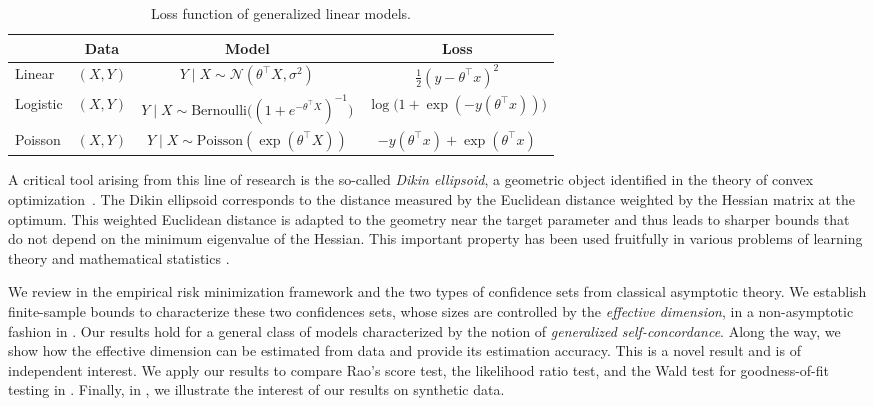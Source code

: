 \begin{table*}[t]
    \caption{Loss function of generalized linear models.}
    \label{tab:glms}
    \centering
    \renewcommand{\arraystretch}{1.2}
    \begin{tabular}{lccc}
        \addlinespace[0.4em]
        \toprule
        & \multicolumn{1}{c}{\textbf{Data}} & \multicolumn{1}{c}{\textbf{Model}} & \textbf{Loss} \\
        \midrule
        Linear & $(X, Y)$ & $Y \mid X \sim \mathcal{N}(\theta^\top X, \sigma^2)$ & $\frac12 (y - \theta^\top x)^2$ \\
        Logistic & $(X, Y)$ & $Y \mid X \sim \mbox{Bernoulli}\big((1 + e^{-\theta^\top X})^{-1}\big)$ & $\log{\big(1 + \exp(-y(\theta^\top x))\big)}$\\
        Poisson & $(X, Y)$ & $Y \mid X \sim \mbox{Poisson}(\exp(\theta^\top X))$ & $-y(\theta^\top x) + \exp(\theta^\top x)$ \\
        \bottomrule
    \end{tabular}
\end{table*}

A critical tool arising from this line of research is the so-called \emph{Dikin ellipsoid}, a geometric object identified in the theory of convex optimization~\citep{yurii1994interior,ben2001lectures,boyd2004convex,tunccel2010self,bubeck2016black,bubeck:2019}.
The Dikin ellipsoid corresponds to the distance measured by the Euclidean distance weighted by the Hessian matrix at the optimum.
This weighted Euclidean distance is adapted to the geometry near the target parameter and thus leads to sharper bounds that do not depend on the minimum eigenvalue of the Hessian. This important property has been used fruitfully in various problems of learning theory and mathematical statistics \citep{zhang2015disco,yang2016optimistic,faury2020improved}.

We review in  the empirical risk minimization framework and the two types of confidence sets from classical asymptotic theory.
We establish finite-sample bounds to characterize these two confidences sets, whose sizes are controlled by the \emph{effective dimension}, in a non-asymptotic fashion in .
Our results hold for a general class of models characterized by the notion of \emph{generalized self-concordance}.
Along the way, we show how the effective dimension can be estimated from data and provide its estimation accuracy.
This is a novel result and is of independent interest.
We apply our results to compare Rao's score test, the likelihood ratio test, and the Wald test for goodness-of-fit testing in .
Finally, in , we illustrate the interest of our results on synthetic data.
